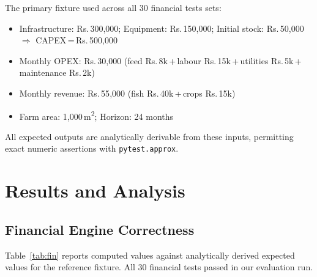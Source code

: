\documentclass[conference]{IEEEtran}
\newcommand{\inr}[1]{Rs.\,#1}
\begin{document}
The primary fixture used across all 30 financial tests sets:
\begin{itemize}
  \item Infrastructure: \inr{300{,}000}; Equipment: \inr{150{,}000};
        Initial stock: \inr{50{,}000}
        $\Rightarrow$ CAPEX\,=\,\inr{500{,}000}
  \item Monthly OPEX: \inr{30{,}000}
        (feed \inr{8k}\,+\,labour \inr{15k}\,+\,utilities
         \inr{5k}\,+\,maintenance \inr{2k})
  \item Monthly revenue: \inr{55{,}000}
        (fish \inr{40k}\,+\,crops \inr{15k})
  \item Farm area: 1{,}000\,m\textsuperscript{2};
        Horizon: 24 months
\end{itemize}

All expected outputs are analytically derivable from these inputs,
permitting exact numeric assertions with \texttt{pytest.approx}.


\section{Results and Analysis}
\label{sec:results}

\subsection{Financial Engine Correctness}

Table~\ref{tab:fin} reports computed values against analytically
derived expected values for the reference fixture. All 30 financial
tests passed in our evaluation run.
\end{document}
